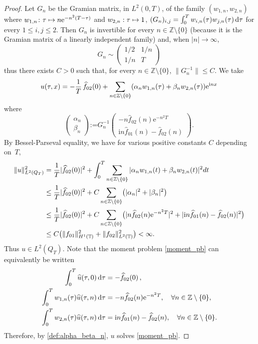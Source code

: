 \documentclass[JEP,XML,SOM,Unicode,NoEqCountersInSection]{cedram}
\def\mto{\mathchoice{\longmapsto}{\mapsto}{\mapsto}{\mapsto}}
\theoremstyle{plain}
\theoremstyle{definition}
\theoremstyle{remark}
\newcommand{\diff}[1][-3]{\ensuremath{\mathop{}\mkern#1mu\mathrm{d}}}
\newcommand{\set}{\mathbb}
\newcommand{\Z}{\set{Z}}
\newcommand{\T}{\set{T}}
\newcommand{\coloneqq}{\mathrel{\mathord{:}\mathord=}}
\newcommand{\eu}{\mathrm e}
\newcommand{\iu}{\mathrm i}
\let\originalleft\left
\let\originalright\right
\renewcommand{\left}{\mathopen{}\mathclose\bgroup\originalleft}
\renewcommand{\right}{\aftergroup\egroup\originalright}
\begin{document}
\begin{proof}
Let $G_n$ be the Gramian matrix, in $L^2(0,T)$, of the family $(w_{1,n},w_{2,n})$ where $w_{1,n}\colon\tau \mto n \eu^{-n^2(T-\tau)}$ and $w_{2,n}: \tau \mto 1$, \ie $(G_n)_{i,j}=\int_0^T w_{i,n}(\tau) w_{j,n}(\tau) \diff\tau$ for every $1 \leq i,j \leq 2$.
Then $G_n$ is invertible for every $n\in\Z\setminus\{0\}$
(because it is the Gramian matrix of a linearly independent family)
and, when $|n| \to \infty$,
\[
G_n \sim \begin{pmatrix}
1/2 & 1/n \\ 1/n & T
\end{pmatrix}
\]
thus there exists $C>0$ such that, for every $n\in\mathbb{Z} \setminus\{0\}$, $\| G_n^{-1} \| \leq C$. We take
\[
u(\tau,x)= - \frac{1}{T}\, \widehat{f}_{02}(0) + \sum_{n\in\mathbb{Z}\setminus\{0\}} \left(\alpha_n w_{1,n}(\tau) + \beta_n w_{2,n}(\tau) \right) \eu^{\iu nx}
\]
where
\begin{equation} \label{def:alpha_beta_n}
\begin{pmatrix} \alpha_n \\ \beta_n \end{pmatrix}\coloneqq G_n^{-1}
\begin{pmatrix}
-n \widehat{f}_{02}(n) \eu^{-n^2 T}
\\
\iu n \widehat{f}_{01}(n) - \widehat{f}_{02}(n)
\end{pmatrix}.
\end{equation}
By Bessel-Parseval equality, we have for various positive constants $C$ depending on~$T$,
\begin{align*}
\|u\|_{L^2(Q_T)}^2
& =\frac{1}{T} |\widehat{f}_{02}(0)|^2 + \int_0^T \sum_{n\in\Z\setminus\{0\}}| \alpha_n w_{1,n}(t) + \beta_n w_{2,n}(t) |^2 dt \\
& \leq \frac{1}{T} |\widehat{f}_{02}(0)|^2 + C\sum_{n\in\Z\setminus\{0\}} \left(|\alpha_n|^2 + |\beta_n|^2 \right) \\
& \leq \frac{1}{T} |\widehat{f}_{02}(0)|^2 + C \sum_{n\in\Z\setminus\{0\}} \bigl(|n \widehat{f}_{02}(n) \eu^{-n^2 T}|^2 + |\iu n \widehat{f}_{01}(n) - \widehat{f}_{02}(n)|^2 \bigr) \\
& \leq C \bigl(\|f_{01}\|_{H^1(\T)}^2 + \|f_{02}\|_{L^2(\T)}^2 \bigr) < \infty.
\end{align*}
Thus $u\in L^2(Q_T)$. Note that the moment problem \eqref{moment_pb}
can equivalently be written
\begin{equation} \label{moment_pb_bis}
\begin{split}
\int_0^T \widehat{u}(\tau,0) \diff \tau&=- \widehat{f}_{02}(0)\,, \\
\int_0^T w_{1,n}(\tau) \widehat{u}(\tau,n) \diff \tau&=- n \widehat{f}_{02}(n) \eu^{-n^2 T}, \quad \forall n \in \mathbb{Z}\setminus\{0\}, \\
\int_0^T w_{2,n}(\tau) \widehat{u}(\tau,n) \diff \tau &= \iu n \widehat{f}_{01}(n) - \widehat{f}_{02}(n), \quad \forall n \in \mathbb{Z}\setminus\{0\}.
\end{split}
\end{equation}
Therefore, by \eqref{def:alpha_beta_n}, $u$ solves \eqref{moment_pb}.
\end{proof}
\end{document}
